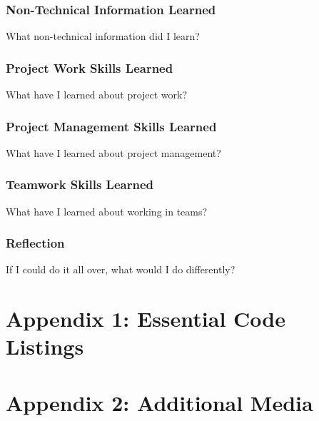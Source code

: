 \documentclass[onecolumn, draftclsnofoot,10pt, compsoc]{IEEEtran}
\begin{document}
\subsubsection{Non-Technical Information Learned}
What non-technical information did I learn?
\subsubsection{Project Work Skills Learned}
What have I learned about project work?
\subsubsection{Project Management Skills Learned}
What have I learned about project management?
\subsubsection{Teamwork Skills Learned}
What have I learned about working in teams?
\subsubsection{Reflection}
If I could do it all over, what would I do differently?


\appendix

\section{Appendix 1: Essential Code Listings}

\section{Appendix 2: Additional Media}
\end{document}
